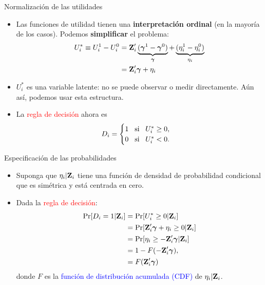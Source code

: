 \documentclass[10pt, xcolor=dvipsnames]{beamer}
\begin{document}
\begin{frame}{Normalización de las utilidades}
\begin{itemize}\setlength{\itemsep}{1em}
	\item Las funciones de utilidad tienen una \textbf{interpretación ordinal} (en la mayoría de los casos). Podemos \textbf{simplificar} el problema:
	\begin{align*}
		\begin{split}
			U^{*}_i \equiv U^{1}_i - U^{0}_i &= \textbf{Z}'_i \underbrace{(\boldsymbol{\gamma}^1-\boldsymbol{\gamma}^0)}_{\boldsymbol{\gamma}} + \underbrace{(\eta^1_i - \eta^0_i)}_{\eta_i} \\
			&= \textbf{Z}'_i \boldsymbol{\gamma} + \eta_i
		\end{split}
	\end{align*}
    \item $U^{*}_i$ es una variable latente: no se puede observar o medir directamente. Aún así, podemos usar esta estructura. %
	\item La \textcolor{red}{regla de decisión} ahora es
	\begin{align*}
		D_i =\begin{cases}
			1 \hspace{0.3cm} \text{si} \;\;\; U^{*}_i \geq 0,\\		
			0 \hspace{0.3cm} \text{si} \;\;\; U^{*}_i < 0.\\
		\end{cases}
	\end{align*}
\end{itemize}
\end{frame}


\begin{frame}{Especificación de las probabilidades}
\begin{itemize}\setlength{\itemsep}{1em}
	\item Suponga que $\eta_i|\textbf{Z}_i$ tiene una función de densidad de probabilidad condicional que es simétrica y está centrada en cero.
	\item Dada la \textcolor{red}{regla de decisión}:
	\begin{align*}
		\begin{split}
			\Pr[D_i=1|\textbf{Z}_i] &= \Pr[U^{*}_i\geq0|\textbf{Z}_i] \\
			&= \Pr[\textbf{Z}'_i\boldsymbol{\gamma} + \eta_i\geq0|\textbf{Z}_i] \\
			&= \Pr[\eta_i \geq -\textbf{Z}'_i\boldsymbol{\gamma} |\textbf{Z}_i] \\
			&= 1-F(-\textbf{Z}'_i\boldsymbol{\gamma}), \\
			&= F(\textbf{Z}'_i\boldsymbol{\gamma})
		\end{split}
	\end{align*}
	donde $F$ es la \textcolor{blue}{función de distribución acumulada (CDF)} de $\eta_i|\textbf{Z}_i$. 
\end{itemize}	
\end{frame}
\end{document}
